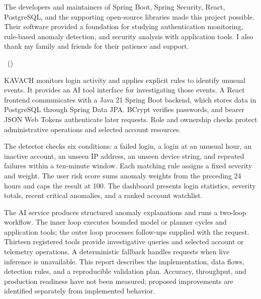 \documentclass[a4paper,12pt]{nitathesis}
\numberwithin{figure}{chapter}
\begin{document}
The developers and maintainers of Spring Boot, Spring Security, React, PostgreSQL, and the supporting open-source libraries made this project possible. Their software provided a foundation for studying authentication monitoring, rule-based anomaly detection, and security analysis with application tools. I also thank my family and friends for their patience and support.
\vspace{1cm}\par\hfill\CandidateName\ (\RollNumber)
\clearpage\begingroup\setlength{\parskip}{0pt}\listoffigures\endgroup\clearpage\begingroup\setlength{\parskip}{0pt}\listoftables\endgroup
{}
KAVACH monitors login activity and applies explicit rules to identify unusual events. It provides an AI tool interface for investigating those events. A React frontend communicates with a Java 21 Spring Boot backend, which stores data in PostgreSQL through Spring Data JPA. BCrypt verifies passwords, and bearer JSON Web Tokens authenticate later requests. Role and ownership checks protect administrative operations and selected account resources.

The detector checks six conditions: a failed login, a login at an unusual hour, an inactive account, an unseen IP address, an unseen device string, and repeated failures within a ten-minute window. Each matching rule assigns a fixed severity and weight. The user risk score sums anomaly weights from the preceding 24 hours and caps the result at 100. The dashboard presents login statistics, severity totals, recent critical anomalies, and a ranked account watchlist.

The AI service produces structured anomaly explanations and runs a two-loop workflow. The inner loop executes bounded model or planner cycles and application tools; the outer loop processes follow-ups supplied with the request. Thirteen registered tools provide investigative queries and selected account or telemetry operations. A deterministic fallback handles requests when live inference is unavailable. This report describes the implementation, data flows, detection rules, and a reproducible validation plan. Accuracy, throughput, and production readiness have not been measured; proposed improvements are identified separately from implemented behavior.
\end{document}
